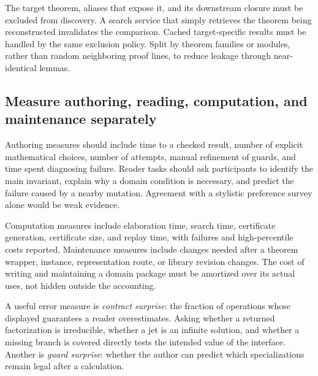 \documentclass[11pt,a4paper]{article}
\theoremstyle{remark}
\begin{document}
The target theorem, aliases that expose it, and its downstream closure must be
excluded from discovery. A search service that simply retrieves the theorem
being reconstructed invalidates the comparison. Cached target-specific results
must be handled by the same exclusion policy. Split by theorem families or
modules, rather than random neighboring proof lines, to reduce leakage through
near-identical lemmas.

\subsection{Measure authoring, reading, computation, and maintenance separately}
Authoring measures should include time to a checked result, number of explicit
mathematical choices, number of attempts, manual refinement of guards, and time
spent diagnosing failure. Reader tasks should ask participants to identify the
main invariant, explain why a domain condition is necessary, and predict the
failure caused by a nearby mutation. Agreement with a stylistic preference survey
alone would be weak evidence.

Computation measures include elaboration time, search time, certificate generation,
certificate size, and replay time, with failures and high-percentile costs
reported. Maintenance measures include changes needed after a theorem wrapper,
instance, representation route, or library revision changes. The cost of writing
and maintaining a domain package must be amortized over its actual uses, not
hidden outside the accounting.

A useful error measure is \emph{contract surprise}: the fraction of operations
whose displayed guarantees a reader overestimates. Asking whether a returned
factorization is irreducible, whether a jet is an infinite solution, and whether
a missing branch is covered directly tests the intended value of the interface.
Another is \emph{guard surprise}: whether the author can predict which
specializations remain legal after a calculation.

\end{document}
